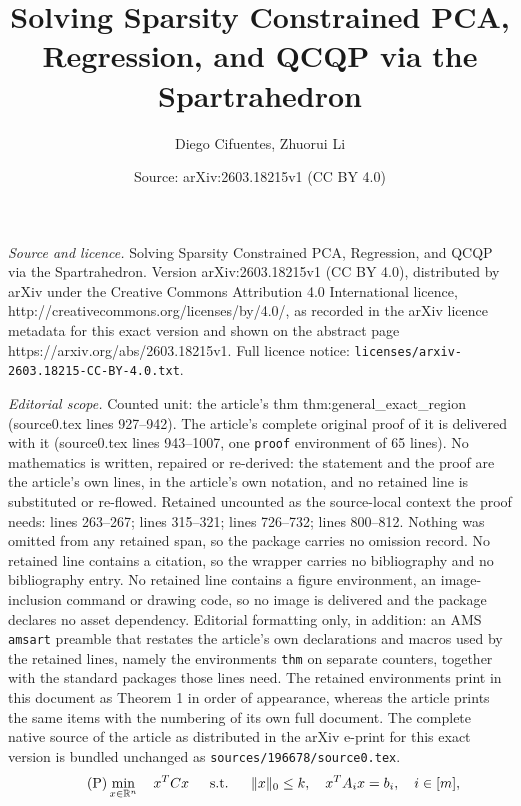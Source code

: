 \documentclass[10pt,a4paper]{amsart}
\title{Solving Sparsity Constrained PCA, Regression, and QCQP via the Spartrahedron}
\author{Diego Cifuentes, Zhuorui Li}
\date{Source: arXiv:2603.18215v1 (CC BY 4.0)}
\newcommand{\RR}{\mathbb{R}}
\newcommand{\st}{\text{\, s.t.\, }}
\begin{document}
\maketitle

\noindent\emph{Source and licence.} Solving Sparsity Constrained PCA, Regression, and QCQP via the Spartrahedron. Version arXiv:2603.18215v1 (CC BY 4.0), distributed by arXiv under the Creative Commons Attribution 4.0 International licence, http://creativecommons.org/licenses/by/4.0/, as recorded in the arXiv licence metadata for this exact version and shown on the abstract page https://arxiv.org/abs/2603.18215v1. Full licence notice: \texttt{licenses/arxiv-2603.18215-CC-BY-4.0.txt}.\par\smallskip

\noindent\textit{Editorial scope.} Counted unit: the article's thm thm:general\_exact\_region (source0.tex lines 927--942). The article's complete original proof of it is delivered with it (source0.tex lines 943--1007, one \texttt{proof} environment of 65 lines). No mathematics is written, repaired or re-derived: the statement and the proof are the article's own lines, in the article's own notation, and no retained line is substituted or re-flowed.  Retained uncounted as the source-local context the proof needs: lines 263--267; lines 315--321; lines 726--732; lines 800--812.  Nothing was omitted from any retained span, so the package carries no omission record.  No retained line contains a citation, so the wrapper carries no bibliography and no bibliography entry.  No retained line contains a figure environment, an image-inclusion command or drawing code, so no image is delivered and the package declares no asset dependency.  Editorial formatting only, in addition: an AMS \texttt{amsart} preamble that restates the article's own declarations and macros used by the retained lines, namely the environments \texttt{thm} on separate counters, together with the standard packages those lines need.  The retained environments print in this document as Theorem 1 in order of appearance, whereas the article prints the same items with the numbering of its own full document.  The complete native source of the article as distributed in the arXiv e-print for this exact version is bundled unchanged as \texttt{sources/196678/source0.tex}.
	\begin{equation}\label{sparse_qcqp}\tag{\small{P}}
		\min_{x\in\RR^n}\quad x^T C x
		\quad\st\quad \|x\|_0\leq k,\quad
		x^T A_i x = b_i,\quad i\in [m],
	\end{equation}
\end{document}
